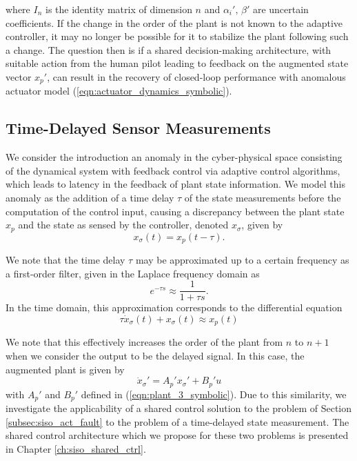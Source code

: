 where $I_n$ is the identity matrix of dimension $n$ and $\alpha_i', \, \beta'$ are uncertain coefficients. If the change in the order of the plant is not known to the adaptive controller, it may no longer be possible for it to stabilize the plant following such a change. The question then is if a shared decision-making architecture, with suitable action from the human pilot leading to feedback on the augmented state vector $x_p'$, can result in the recovery of closed-loop performance with anomalous actuator model (\ref{eqn:actuator_dynamics_symbolic}).

\subsection{Time-Delayed Sensor Measurements} \label{subsec:siso_delay}
We consider the introduction an anomaly in the cyber-physical space consisting of the dynamical system with feedback control via adaptive control algorithms, which leads to latency in the feedback of plant state information. We model this anomaly as the addition of a time delay $\tau$ of the state measurements before the computation of the control input, causing a discrepancy between the plant state $x_p$ and the state as sensed by the controller, denoted $x_\sigma$, given by
\begin{equation}
	x_\sigma(t) = x_p(t - \tau).
\end{equation}

We note that the time delay $\tau$ may be approximated up to a certain frequency as a first-order filter, given in the Laplace frequency domain as
\begin{equation}
	e^{-\tau s} \approx \frac{1}{1 + \tau s}.
	\label{first_order_delay_approx}
\end{equation}
In the time domain, this approximation corresponds to the differential equation
\begin{equation}
	\tau \dot{x}_{\sigma}(t) + x_{\sigma}(t) \approx x_p(t)	
\end{equation}

We note that this effectively increases the order of the plant from $n$ to $n+1$ when we consider the output to be the delayed signal. In this case, the augmented plant is given by
\begin{equation}
	\dot{x}_\sigma' = A_p' x_\sigma' + B_p' u \label{eqn:plant_3_tau}
\end{equation}
with $A_p'$ and $B_p'$ defined in (\ref{eqn:plant_3_symbolic}). Due to this similarity, we investigate the applicability of a shared control solution to the problem of Section \ref{subsec:siso_act_fault} to the problem of a time-delayed state measurement. The shared control architecture which we propose for these two problems is presented in Chapter \ref{ch:siso_shared_ctrl}.

